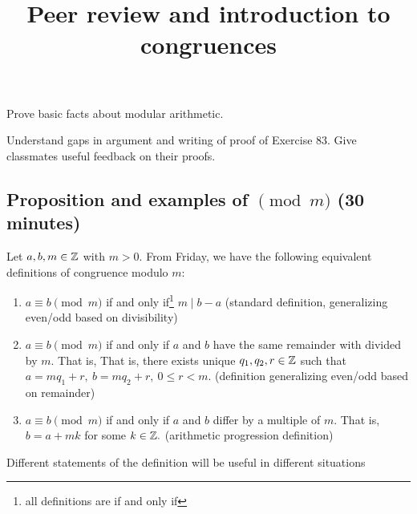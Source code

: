 \documentclass{../ximera}
\title{Peer review and introduction to congruences}
\begin{document}
\begin{abstract}
\end{abstract}
\maketitle


\begin{obj}
\item Prove basic facts about modular arithmetic.
 \item Understand gaps in argument and writing of proof of Exercise 83. Give classmates useful feedback on their proofs.
\end{obj}
\subsection{Proposition and examples of $\pmod m$ (30 minutes)}

\begin{defn}\label{defn:mod-equiv-all}
Let $a,b,m\in\mathbb Z$ with $m>0.$ From Friday, we have the following equivalent definitions of congruence modulo $m:$
\begin{enumerate}
 \item $a\equiv b \pmod m$ if and only if\footnote{all definitions are if and only if} $m\mid b-a$ (standard definition, generalizing even/odd based on divisibility)
 \item $a\equiv b \pmod m$ if and only if $a$ and $b$ have the same remainder with divided by $m.$ That is, That is, there exists unique $q_1,q_2,r\in\mathbb Z$ such that  $a=mq_1+r,\   b=mq_2+r,\  0\leq r<m.$ (definition generalizing even/odd based on remainder)
\item $a\equiv b\pmod m$ if and only if $a$ and $b$ differ by a multiple of $m.$ That is, $b=a+mk$ for some $k\in\mathbb Z.$ (arithmetic progression definition)
\end{enumerate}
\end{defn}

Different statements of the definition will be useful in different situations
\end{document}
